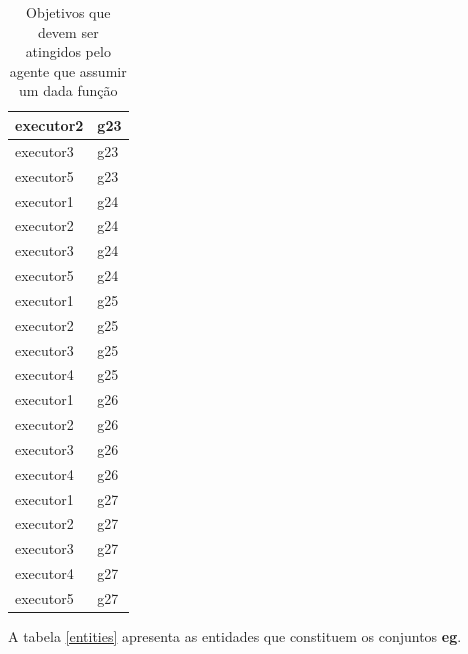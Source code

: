 \documentclass[12pt]{article}
\begin{document}
\begin{table}[H]
\begin{tabular}{|l|l|}
executor2 & g23 \\ \hline
executor3 & g23 \\ \hline
executor5 & g23 \\ \hline
executor1 & g24 \\ \hline
executor2 & g24 \\ \hline
executor3 & g24 \\ \hline
executor5 & g24 \\ \hline
executor1 & g25 \\ \hline
executor2 & g25 \\ \hline
executor3 & g25 \\ \hline
executor4 & g25 \\ \hline
executor1 & g26 \\ \hline
executor2 & g26 \\ \hline
executor3 & g26 \\ \hline
executor4 & g26 \\ \hline
executor1 & g27 \\ \hline
executor2 & g27 \\ \hline
executor3 & g27 \\ \hline
executor4 & g27 \\ \hline
executor5 & g27 \\ \hline
\end{tabular}
\caption{Objetivos que devem ser atingidos pelo agente que assumir um dada função}
\label{deontic2}
\end{table}

A tabela \ref{entities} apresenta as entidades que constituem os conjuntos \textbf{eg}.
\end{document}
